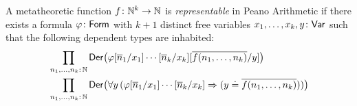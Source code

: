 \begin{defn}
    A metatheoretic function $f\colon\N^k\to\N$ is \textsl{representable} in Peano Arithmetic if there exists a formula $\varphi\colon\fun{Form}$ with $k+1$ distinct free variables $x_1,\dots,x_k,y\colon\fun{Var}$ such that the following dependent types are inhabited:
        \begin{align*}
            &\prod_{n_1,\dots,n_k\colon\N}
                \fun{Der}\bigl(
                    \varphi[\num n_1/x_1]
                    \cdots[\num n_k/x_k]
                    [\num{f(n_1,\dots,n_k)}/y]
                \bigr)\\
            &\prod_{n_1,\dots,n_k\colon\N}
                \fun{Der}\bigl(
                    \forall y\,(
                        \varphi[\num n_1/x_1]
                            \cdots[\num n_k/x_k]
                            \imp (y\doteq\num{f(n_1,\dots,n_k)})
                    )
                \bigr)
        \end{align*}
    
\end{defn}

